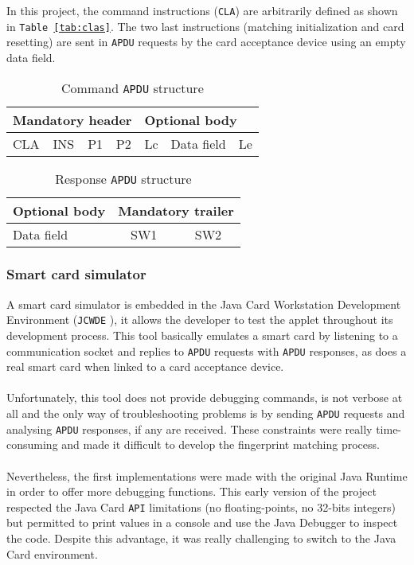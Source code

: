 \documentclass[a4paper,12pt]{article}
\begin{document}
In this project, the command instructions (\texttt{CLA}) are arbitrarily defined as shown in \texttt{Table \ref{tab:clas}}. The two last instructions (matching initialization and card resetting) are sent in \texttt{APDU} requests by the card acceptance device using an empty data field.

\begin{table}[h]
\centering
\begin{tabular}{|l|l|l|l|l|l|l|}
  \hline
  \multicolumn{4}{|l|}{\textbf{Mandatory header}} & \multicolumn{3}{|l|}{\textbf{Optional body}} \\
  \hline
  CLA & INS & P1 & P2 & Lc & Data field & Le \\
  \hline
\end{tabular}
\caption{Command \texttt{APDU} structure}
\label{tab:apducmd}
\end{table}

\begin{table}[h]
\centering
\begin{tabular}{|l|c|c|}
  \hline
  \textbf{Optional body} & \multicolumn{2}{|c|}{\textbf{Mandatory trailer}} \\
  \hline
  Data field & SW1 & SW2 \\
  \hline
\end{tabular}
\caption{Response \texttt{APDU} structure}
\label{tab:apduresp}
\end{table}
\newpage
\subsubsection{Smart card simulator}
A smart card simulator is embedded in the Java Card Workstation Development Environment (\texttt{JCWDE} \cite{jcwde}), it allows the developer to test the applet throughout its development process. This tool basically emulates a smart card by listening to a communication socket and replies to \texttt{APDU} requests with \texttt{APDU} responses, as does a real smart card when linked to a card acceptance device.\\\\
Unfortunately, this tool does not provide debugging commands, is not verbose at all and the only way of troubleshooting problems is by sending \texttt{APDU} requests and analysing \texttt{APDU} responses, if any are received. These constraints were really time-consuming and made it difficult to develop the fingerprint matching process.\\\\
Nevertheless, the first implementations were made with the original Java Runtime in order to offer more debugging functions. This early version of the project respected the Java Card \texttt{API} limitations (no floating-points, no 32-bits integers) but permitted to print values in a console and use the Java Debugger to inspect the code. Despite this advantage, it was really challenging to switch to the Java Card environment. 
\end{document}
